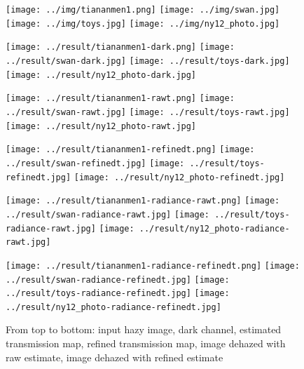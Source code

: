 \documentclass{article}
\begin{document}
\begin{figure}[H]
    \centering
    \begin{minipage}[b]{\linewidth}
        \centering
        \texttt{[image: ../img/tiananmen1.png]}
        \texttt{[image: ../img/swan.jpg]}
        \texttt{[image: ../img/toys.jpg]}
        \texttt{[image: ../img/ny12\_photo.jpg]}
    \end{minipage}
    \begin{minipage}[b]{\linewidth}
        \centering
        \texttt{[image: ../result/tiananmen1-dark.png]}
        \texttt{[image: ../result/swan-dark.jpg]}
        \texttt{[image: ../result/toys-dark.jpg]}
        \texttt{[image: ../result/ny12\_photo-dark.jpg]}
    \end{minipage}
    \begin{minipage}[b]{\linewidth}
        \centering
        \texttt{[image: ../result/tiananmen1-rawt.png]}
        \texttt{[image: ../result/swan-rawt.jpg]}
        \texttt{[image: ../result/toys-rawt.jpg]}
        \texttt{[image: ../result/ny12\_photo-rawt.jpg]}
    \end{minipage}
    \begin{minipage}[b]{\linewidth}
        \centering
        \texttt{[image: ../result/tiananmen1-refinedt.png]}
        \texttt{[image: ../result/swan-refinedt.jpg]}
        \texttt{[image: ../result/toys-refinedt.jpg]}
        \texttt{[image: ../result/ny12\_photo-refinedt.jpg]}
    \end{minipage}
    \begin{minipage}[b]{\linewidth}
        \centering
        \texttt{[image: ../result/tiananmen1-radiance-rawt.png]}
        \texttt{[image: ../result/swan-radiance-rawt.jpg]}
        \texttt{[image: ../result/toys-radiance-rawt.jpg]}
        \texttt{[image: ../result/ny12\_photo-radiance-rawt.jpg]}
    \end{minipage}
    \begin{minipage}[b]{\linewidth}
        \centering
        \texttt{[image: ../result/tiananmen1-radiance-refinedt.png]}
        \texttt{[image: ../result/swan-radiance-refinedt.jpg]}
        \texttt{[image: ../result/toys-radiance-refinedt.jpg]}
        \texttt{[image: ../result/ny12\_photo-radiance-refinedt.jpg]}
    \end{minipage}
    \caption{From top to bottom: input hazy image, dark channel, estimated transmission map, refined transmission map, image dehazed with raw estimate, image dehazed with refined estimate}
    \label{fig:result3}

\end{figure}
\end{document}
